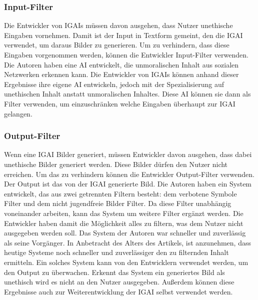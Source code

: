 \documentclass[12pt]{report}
\begin{document}
\subsubsection{Input-Filter}
Die Entwickler von IGAIs müssen davon ausgehen, dass Nutzer unethische Eingaben vornehmen. Damit ist der Input in Textform gemeint, den die IGAI verwendet, um daraus Bilder zu generieren. Um zu verhindern, dass diese Eingaben vorgenommen werden, können die Entwickler Input-Filter verwenden. Die Autoren \cite{Shah} haben eine AI entwickelt, die unmoralischen Inhalt aus sozialen Netzwerken erkennen kann. Die Entwickler von IGAIs können anhand dieser Ergebnisse ihre eigene AI entwickeln, jedoch mit der Spezialisierung auf unethischen Inhalt anstatt unmoralischen Inhaltes. Diese AI können sie dann als Filter verwenden, um einzuschränken welche Eingaben überhaupt zur IGAI gelangen.

\subsubsection{Output-Filter}
Wenn eine IGAI Bilder generiert, müssen Entwickler davon ausgehen, dass dabei unethische Bilder generiert werden. Diese Bilder dürfen den Nutzer nicht erreichen. Um das zu verhindern können die Entwickler Output-Filter verwenden. Der Output ist das von der IGAI generierte Bild. Die Autoren \cite{Zheng} haben ein System entwickelt, das aus zwei getrennten Filtern besteht: dem verbotene Symbole Filter und dem nicht jugendfreie Bilder Filter. Da diese Filter unabhängig voneinander arbeiten, kann das System um weitere Filter ergänzt werden. Die Entwickler haben damit die Möglichkeit alles zu filtern, was dem Nutzer nicht ausgegeben werden soll. Das System der Autoren war schneller und zuverlässig als seine Vorgänger. In Anbetracht des Alters des Artikels, ist anzunehmen, dass heutige Systeme noch schneller und zuverlässiger den zu filternden Inhalt ermitteln. Ein solches System kann von den Entwicklern verwendet werden, um den Output zu überwachen. Erkennt das System ein generiertes Bild als unethisch wird es nicht an den Nutzer ausgegeben. Außerdem können diese Ergebnisse auch zur Weiterentwicklung der IGAI selbst verwendet werden.
\end{document}

